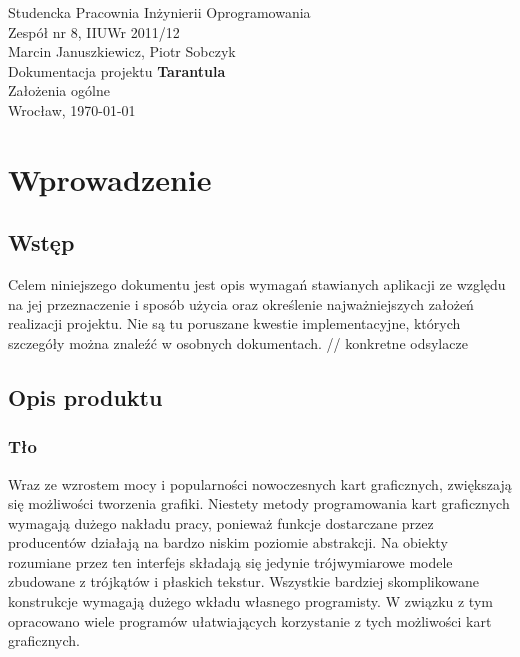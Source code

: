 \documentclass[11pt,leqno]{article}
\begin{document}
\begin{center}
\thispagestyle{empty}
{\Large Studencka Pracownia Inżynierii Oprogramowania}\\[0.5cm]
{\Large Zespół nr 8, IIUWr 2011/12}\\[2.5cm]

{\large Marcin Januszkiewicz, Piotr Sobczyk}\\[0.5cm]
{\huge Dokumentacja projektu \textbf{Tarantula}}\\[0.5cm]
{\huge Założenia ogólne}\\[0.5cm]
\vfill
{\large Wrocław, \today}
\end{center}
\newpage
\tableofcontents

\newpage


\newpage
\section{Wprowadzenie}

\subsection{Wstęp}
\noindent
Celem niniejszego dokumentu jest opis wymagań stawianych aplikacji ze względu na jej przeznaczenie i 
sposób użycia oraz określenie najważniejszych założeń realizacji projektu. 
Nie są tu poruszane kwestie implementacyjne, których szczegóły można znaleźć w osobnych dokumentach. // konkretne odsylacze

\subsection{Opis produktu}

\subsubsection{Tło}
\noindent
Wraz ze wzrostem mocy i popularności nowoczesnych kart graficznych, zwiększają się możliwości tworzenia grafiki. 
Niestety metody programowania kart graficznych wymagają dużego nakładu pracy, ponieważ funkcje dostarczane przez producentów 
działają na bardzo niskim poziomie abstrakcji. Na obiekty rozumiane przez ten interfejs składają się jedynie trójwymiarowe modele zbudowane z trójkątów i płaskich tekstur. 
Wszystkie bardziej skomplikowane konstrukcje wymagają dużego wkładu własnego programisty. W związku z tym opracowano wiele programów 
ułatwiających korzystanie z tych możliwości kart graficznych. 
\end{document}
